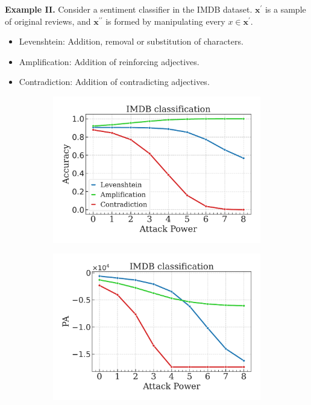 \begin{frame}
	\textbf{Example II.} Consider a sentiment classifier in the IMDB dataset. $\bm{x}^\prime$ is a sample of original
	reviews, and $\bm{x}^{\prime\prime}$ is formed by manipulating every $x \in \bm{x}^\prime$.

	\begin{itemize}
		\item Levenshtein: Addition, removal or substitution of characters.
		\item Amplification: Addition of reinforcing adjectives.
		\item Contradiction: Addition of contradicting adjectives.
	\end{itemize}

	\begin{figure}[H]
		\centering
		\begin{subfigure}[b]{0.3\textwidth}
			\centering
			\includegraphics[width=\textwidth]{img/experimental_setup/presentation_acc.pdf}
		\end{subfigure}
		\hspace{1em}
		\begin{subfigure}[b]{0.3\textwidth}
			\centering
			\includegraphics[width=\textwidth]{img/experimental_setup/presentation_pa.pdf}

\end{subfigure}
\end{figure}
\end{frame}
